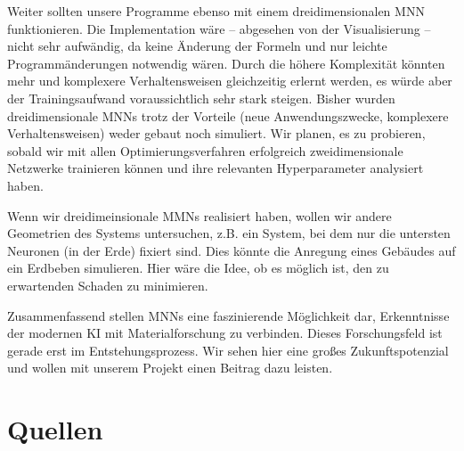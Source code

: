\documentclass[10pt]{scrartcl}
\begin{document}


Weiter sollten unsere Programme ebenso mit einem dreidimensionalen MNN funktionieren.
Die Implementation wäre -- abgesehen von der Visualisierung -- nicht sehr aufwändig, da keine Änderung der Formeln und nur leichte Programmänderungen notwendig wären.
Durch die höhere Komplexität könnten mehr und komplexere Verhaltensweisen gleichzeitig erlernt werden, es würde aber der Trainingsaufwand voraussichtlich sehr stark steigen.
Bisher wurden dreidimensionale MNNs trotz der Vorteile (neue Anwendungszwecke, komplexere Verhaltensweisen) weder gebaut noch simuliert.
Wir planen, es zu probieren, sobald wir mit allen Optimierungsverfahren erfolgreich zweidimensionale Netzwerke trainieren können und ihre relevanten Hyperparameter analysiert haben.

Wenn wir dreidimeinsionale MMNs realisiert haben, wollen wir andere Geometrien des Systems untersuchen, z.B. ein System, bei dem nur die untersten Neuronen (in der Erde) fixiert sind. Dies könnte die Anregung eines Gebäudes auf ein Erdbeben simulieren. Hier wäre die Idee, ob es möglich ist, den zu erwartenden Schaden zu minimieren.

Zusammenfassend stellen MNNs eine faszinierende Möglichkeit dar, Erkenntnisse der modernen KI mit Materialforschung zu verbinden. Dieses Forschungsfeld ist gerade erst im Entstehungsprozess. Wir sehen hier eine großes Zukunftspotenzial und wollen mit unserem Projekt einen Beitrag dazu leisten.

\newpage

\section{Quellen}

\printbibliography[heading=none]
\end{document}
